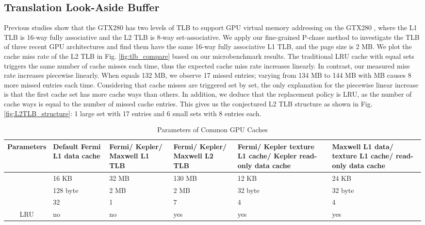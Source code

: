 \documentclass[10pt,journal,compsoc]{IEEEtran}
\theoremstyle{definition}
\begin{document}
\subsection{Translation Look-Aside Buffer}


Previous studies show that the GTX280 has two levels of TLB to support GPU virtual memory addressing on the GTX280 \cite{papadopoulou2009micro,wong2010demystifying}, where the L1 TLB is 16-way fully associative and the L2 TLB is 8-way set-associative. We apply our fine-grained P-chase method to investigate the TLB of three recent GPU architectures and find them have the same 16-way fully associative L1 TLB, and the page size is 2 MB. We plot the cache miss rate of the L2 TLB in Fig. \ref{fig:tlb_compare} based on our microbenchmark results. The traditional LRU cache with equal sets triggers the same number of cache misses each time, thus the expected cache miss rate increases linearly. In contrast, our measured miss rate increases piecewise linearly. When  equals 132 MB, we observe 17 missed entries; varying  from 134 MB to 144 MB with  MB causes 8 more missed entries each time. Considering that cache misses are triggered set by set, the only explanation for the piecewise linear increase is that the first cache set has more cache ways than others. In addition, we deduce that the replacement policy is LRU, as the number of cache ways is equal to the number of missed cache entries. This gives us the conjectured L2 TLB structure as shown in Fig. \ref{fig:L2TLB_structure}: 1 large set with 17 entries and 6 small sets with 8 entries each.

\begin{table*}\renewcommand{\arraystretch}{1.1}
\centering
\caption{Parameters of Common GPU Caches}
\begin{tabular}{|c|m{0.8in}<{\centering}|m{0.8in}<{\centering}|m{0.8in}<{\centering}|m{1.1 in}<{\centering}|m{1.1 in}<{\centering}|}
    \hline
    Parameters & Default Fermi L1 data cache & Fermi/ Kepler/ Maxwell L1 TLB & Fermi/ Kepler/ Maxwell L2 TLB & Fermi/ Kepler texture L1 cache/ Kepler read-only data cache& Maxwell L1 data/ texture L1 cache/ read-only data cache \\ \hline
     & 16 KB  & 32 MB & 130 MB & 12 KB & 24 KB\\ \hline
     & 128 byte & 2 MB & 2 MB & 32 byte & 32 byte \\ \hline
     & 32 & 1 & 7 & 4  &4 \\ \hline
    LRU & no & no & yes & yes &yes\\ \hline
\end{tabular}
\label{tab:parameters}

\end{table*}
\end{document}
